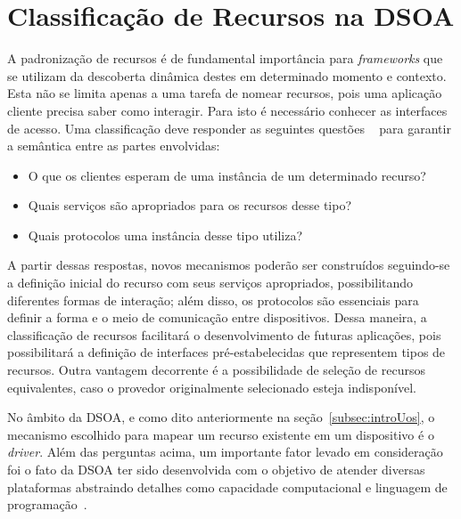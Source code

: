 \chapter{Classificação de Recursos na DSOA}
\label{cap:proposta}

A padronização de recursos é de fundamental importância para \emph{frameworks} que se utilizam da descoberta dinâmica destes em determinado momento e contexto. Esta não se limita apenas a uma tarefa de nomear recursos, pois uma aplicação cliente precisa saber como interagir. Para isto é necessário conhecer as interfaces de acesso. Uma classificação deve responder as seguintes questões ~\cite{pervasiveComputing} para garantir a semântica entre as partes envolvidas:

\begin{itemize}
	\item O que os clientes esperam de uma instância de um determinado recurso?

	\item Quais serviços são apropriados para os recursos desse tipo?

	\item Quais protocolos uma instância desse tipo utiliza?
\end{itemize}

A partir dessas respostas, novos mecanismos poderão ser construídos seguindo-se a definição inicial do recurso com seus serviços apropriados, possibilitando diferentes formas de interação; além disso, os protocolos são essenciais para definir a forma e o meio de comunicação entre dispositivos. Dessa maneira, a classificação de recursos facilitará o desenvolvimento de futuras aplicações, pois possibilitará a definição de interfaces pré-estabelecidas que representem tipos de recursos. Outra vantagem decorrente é a possibilidade de seleção de recursos equivalentes, caso o provedor originalmente selecionado esteja indisponível.

No âmbito da DSOA, e como dito anteriormente na seção~\ref{subsec:introUos}, o mecanismo escolhido para mapear um recurso existente em um dispositivo é o \emph{driver}. Além das perguntas acima, um importante fator levado em consideração foi o fato da DSOA ter sido desenvolvida com o objetivo de atender diversas plataformas abstraindo detalhes como capacidade computacional e linguagem de programação~\cite{buzetoDSOA2010}.

